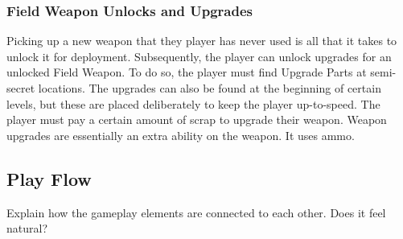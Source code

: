 \documentclass[12pt]{article}
\begin{document}
\subsubsection{Field Weapon Unlocks and Upgrades}

Picking up a new weapon that they player has never used is all that it takes to unlock it for deployment. Subsequently, the player can unlock upgrades for an unlocked Field Weapon. To do so, the player must find Upgrade Parts at semi-secret locations. The upgrades can also be found at the beginning of certain levels, but these are placed deliberately to keep the player up-to-speed. The player must pay a certain amount of scrap to upgrade their weapon. Weapon upgrades are essentially an extra ability on the weapon. It uses ammo.

\subsection{Play Flow}

Explain how the gameplay elements are connected to each other. Does it feel natural?







\end{document}
